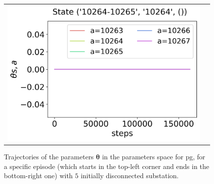 \begin{figure}[!htp]
\begin{tabular}{cc}
        \hspace*{-28pt}\includegraphics[scale=0.36,valign=b]{chapters/figures/theta_PG_state_3.png}
    \end{tabular}
    \caption{\small Trajectories of the parameters $\boldsymbol \theta$ in the parameters space for \acrshort{pg}, for a specific episode (which starts in the top-left corner and ends in the bottom-right one) with $5$ initially disconnected substation.}
    \label{fig:sequence-theta-pg}
\end{figure}

